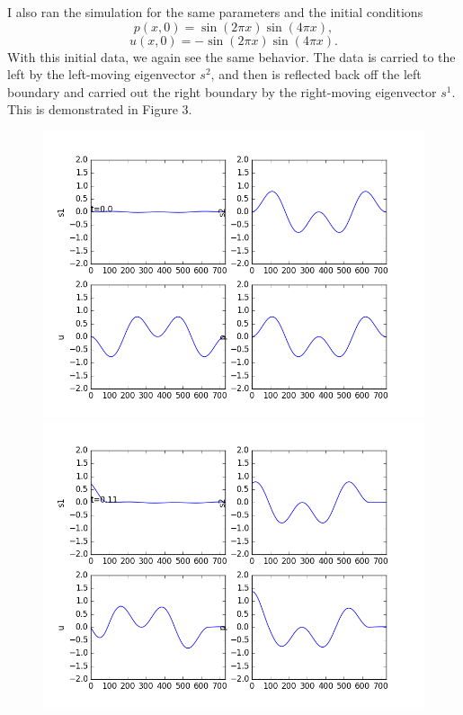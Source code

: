 \documentclass[12pt]{article}
\begin{document}
\begin{enumerate}[(a)]
I also ran the simulation for the same parameters and the initial conditions
$$p(x,0) = \sin(2\pi x)\sin(4 \pi x),$$
$$u(x,0) = -\sin(2\pi x)\sin(4 \pi x).$$
With this initial data, we again see the same behavior.  The data is carried to the left by the left-moving eigenvector $s^2$, and then is reflected back off the left boundary and carried out the right boundary by the right-moving eigenvector $s^1$. This is demonstrated in Figure 3.

\begin{figure}[H]
\centering\includegraphics[scale=0.4]{frame1.png}
\centering\includegraphics[scale=0.4]{frame1_5.png}

\end{figure}
\end{enumerate}
\end{document}

